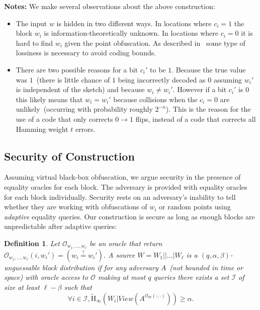 \documentclass[11pt]{article}
\newcommand{\Hav}{\tilde{\mathrm{H}}_\infty}
\newtheorem{definition}[theorem]{Definition}
\begin{document}
\textbf{Notes:}  We make several observations about the above construction:
\begin{itemize}
\item The input $w$ is hidden in two different ways.  In locations where $c_i=1$ the block $w_i$ is information-theoretically unknown.
In locations where $c_i=0$ it is hard to find $w_i$ given the point obfuscation.  As described in~\cite[Section 3.3]{fuller2013computational} some type of lossiness is necessary to avoid coding bounds.
\item There are two possible reasons for a bit $c_i'$ to be $1$.  Because the true value was $1$~(there is little chance of $1$ being incorrectly decoded as $0$ assuming $w_i'$ is independent of the sketch) and because $w_i \neq w_i'$.  However if a bit $c_i'$ is $0$ this likely means that $w_i=w_i'$ because collisions when the $c_i=0$ are unlikely~(occurring with probability roughly $2^{-n}$).  This is the reason for the use of a code that only corrects $0\rightarrow 1$ flips, instead of a code that corrects all Hamming weight $t$ errors.
\end{itemize}

\subsection{Security of Construction}
\label{sec:sec of construction}
Assuming virtual black-box obfuscation, we argue security in the presence of equality oracles for each block.  The adversary is provided with equality oracles for each block individually.  Security rests on an adversary's inability to tell whether they are working with obfuscations of $w_i$ or random points using \emph{adaptive} equality queries.  Our construction is secure as long as enough blocks are unpredictable after adaptive queries:

\begin{definition}
\label{def:block guessable}
Let $\mathcal{O}_{w_1,..., w_\ell}$ be an oracle that return $\mathcal{O}_{w_1,..., w_\ell}(i, w_i')=\left( w_i\overset{?}=w_i'\right)$.
A source $W = W_1||...|W_\ell$ is a $(q, \alpha, \beta)$-\emph{unguessable block distribution} if for any adversary $A$~(not bounded in time or space) with oracle access to $\mathcal{O}$ making at most $q$ queries there exists a set $\mathcal{I}$ of size at least $\ell -\beta$ such that 
\[
\forall i\in \mathcal{I}, \Hav(W_i |View(A^{\mathcal{O}_{W}(\cdot, \cdot)}))\geq \alpha.
\]
\end{definition}
\end{document}
